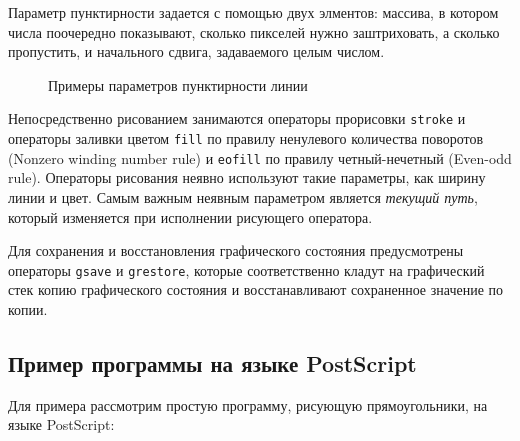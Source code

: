 \documentclass[14pt]{extarticle}
\begin{document}
Параметр пунктирности задается с помощью двух элментов: массива, в котором числа поочередно показывают, сколько пикселей нужно заштриховать, а сколько пропустить, и начального сдвига, задаваемого целым числом.

\begin{figure} [h]
\caption{Примеры параметров пунктирности линии}\label{pic_dash}
\end{figure}

 
Непосредственно рисованием занимаются операторы прорисовки \texttt{stroke} и операторы заливки цветом \texttt{fill} по правилу ненулевого количества поворотов (Nonzero winding number rule) и \texttt{eofill} по правилу четный-нечетный (Even-odd rule)\cite{plrm}. Операторы рисования неявно используют такие параметры, как ширину линии и цвет. Самым важным неявным параметром является \textit{текущий путь}, который изменяется при исполнении рисующего оператора. 

Для сохранения и восстановления графического состояния предусмотрены операторы \texttt{gsave} и \texttt{grestore}, которые соответственно кладут на графический стек копию графического состояния и восстанавливают сохраненное значение по копии.


\subsection{Пример программы на языке PostScript}
Для примера рассмотрим простую программу, рисующую прямоугольники, на языке PostScript: 

\end{document}
